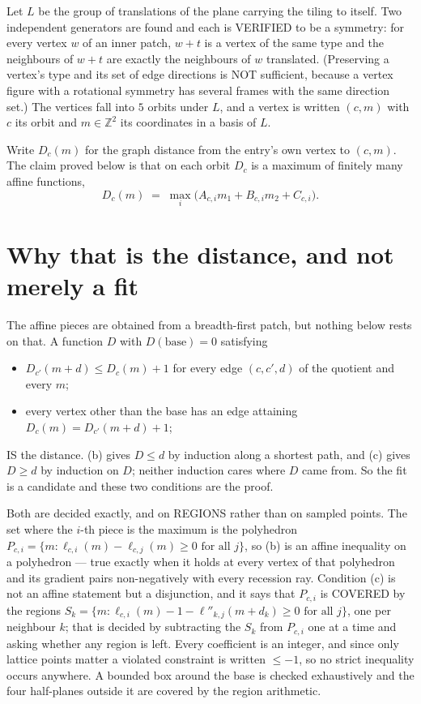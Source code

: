 \documentclass[11pt,a4paper]{article}
\theoremstyle{plain}
\theoremstyle{definition}
\begin{document}
Let $L$ be the group of translations of the plane carrying the tiling to itself. Two
independent generators are found and each is VERIFIED to be a symmetry: for every vertex $w$
of an inner patch, $w+t$ is a vertex of the same type and the neighbours of $w+t$ are exactly
the neighbours of $w$ translated. (Preserving a vertex's type and its set of edge directions
is NOT sufficient, because a vertex figure with a rotational symmetry has several frames with
the same direction set.) The vertices fall into $5$ orbits under $L$, and a vertex is
written $(c,m)$ with $c$ its orbit and $m\in\mathbb{Z}^2$ its coordinates in a basis of $L$.

Write $D_c(m)$ for the graph distance from the entry's own vertex to $(c,m)$. The claim proved
below is that on each orbit $D_c$ is a maximum of finitely many affine functions,
\[
D_c(m)\;=\;\max_i\bigl(A_{c,i}m_1+B_{c,i}m_2+C_{c,i}\bigr).
\]

\section{Why that is the distance, and not merely a fit}

The affine pieces are obtained from a breadth-first patch, but nothing below rests on that. A
function $D$ with $D(\text{base})=0$ satisfying

\begin{itemize}
\item[(b)] $D_{c'}(m+d)\le D_c(m)+1$ for every edge $(c,c',d)$ of the quotient and every $m$;
\item[(c)] every vertex other than the base has an edge attaining $D_c(m)=D_{c'}(m+d)+1$;
\end{itemize}

IS the distance. (b) gives $D\le d$ by induction along a shortest path, and (c) gives $D\ge d$
by induction on $D$; neither induction cares where $D$ came from. So the fit is a candidate and
these two conditions are the proof.

Both are decided exactly, and on REGIONS rather than on sampled points. The set where the
$i$-th piece is the maximum is the polyhedron
$P_{c,i}=\{m: \ell_{c,i}(m)-\ell_{c,j}(m)\ge0 \text{ for all } j\}$, so (b) is an
affine inequality on a polyhedron --- true exactly when it holds at every vertex of that
polyhedron and its gradient pairs non-negatively with every recession ray. Condition (c) is
not an affine statement but a disjunction, and it says that $P_{c,i}$ is COVERED by the
regions
$S_k=\{m:\ell_{c,i}(m)-1-\ell''_{k,j}(m+d_k)\ge0\text{ for all }j\}$, one per
neighbour $k$; that is decided by subtracting the $S_k$ from $P_{c,i}$ one at a time and
asking whether any region is left. Every coefficient is an integer, and since only lattice
points matter a violated constraint is written $\le-1$, so no strict inequality occurs
anywhere. A bounded box around the base is checked exhaustively and the four half-planes
outside it are covered by the region arithmetic.
\end{document}
